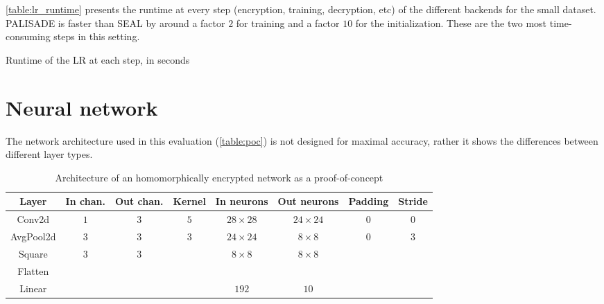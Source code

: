 \documentclass[a4paper,11pt,oneside]{report}
\begin{document}
\autoref{table:lr_runtime} presents the runtime at every step (encryption, training, decryption, etc) of the different backends for the small dataset.
PALISADE is faster than SEAL by around a factor $2$ for training and a factor $10$ for the initialization. 
These are the two most time-consuming steps in this setting.

\begin{table}[h!]
  \begin{center}
    \caption{Runtime of the LR at each step, in seconds}
    \label{table:lr_runtime}
  \end{center}
\end{table}


\section{Neural network}\label{sec:eval_cnn}


The network architecture used in this evaluation (\autoref{table:poc}) is not designed for maximal accuracy, rather it shows the differences between different layer types.

\begin{table}[h!]
  \begin{center}
    \caption{Architecture of an homomorphically encrypted network as a proof-of-concept}
    \label{table:poc}
    \begin{tabular}{ c c c c c c c c }
    \hline
    Layer & In chan. & Out chan. & Kernel & In neurons & Out neurons & Padding & Stride \\
    \hline
    Conv2d & $1$ & $3$ & $5$ & $28 \times 28$ & $24 \times 24$ & $0$ & $0$ \\
    AvgPool2d & $3$ & $3$ & $3$ & $24 \times 24$ & $8 \times 8$ & $0$ & $3$ \\
    Square & $3$ & $3$ & & $8 \times 8$ & $8 \times 8$ &  &  \\
    Flatten \\
    Linear & & & & $192$ & $10$ & &  \\
    \hline
    \end{tabular}
  \end{center}
\end{table}
\end{document}
